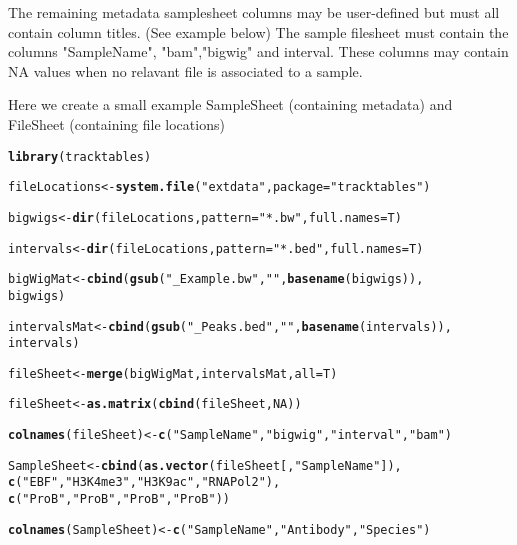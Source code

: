 \documentclass[12pt]{article}\usepackage[]{graphicx}\usepackage[usenames,dvipsnames]{color}
\makeatletter
\newcommand{\hlnum}[1]{\textcolor[rgb]{0.686,0.059,0.569}{#1}}%
\newcommand{\hlstr}[1]{\textcolor[rgb]{0.192,0.494,0.8}{#1}}%
\newcommand{\hlstd}[1]{\textcolor[rgb]{0.345,0.345,0.345}{#1}}%
\newcommand{\hlkwb}[1]{\textcolor[rgb]{0.69,0.353,0.396}{#1}}%
\newcommand{\hlkwc}[1]{\textcolor[rgb]{0.333,0.667,0.333}{#1}}%
\newcommand{\hlkwd}[1]{\textcolor[rgb]{0.737,0.353,0.396}{\textbf{#1}}}%
\newenvironment{kframe}{%
 \def\at@end@of@kframe{}%
 \ifinner\ifhmode%
  \def\at@end@of@kframe{\end{minipage}}%
  \begin{minipage}{\columnwidth}%
 \fi\fi%
 \def\FrameCommand##1{\hskip\@totalleftmargin \hskip-\fboxsep
 \colorbox{shadecolor}{##1}\hskip-\fboxsep
     \hskip-\linewidth \hskip-\@totalleftmargin \hskip\columnwidth}%
 \MakeFramed {\advance\hsize-\width
   \@totalleftmargin\z@ \linewidth\hsize
   \@setminipage}}%
 {\par\unskip\endMakeFramed%
 \at@end@of@kframe}
\newenvironment{knitrout}{}{} %
\makeatother
\begin{document}
The remaining metadata samplesheet columns may be user-defined but must all contain column titles. (See example below)
The sample filesheet must contain the columns "SampleName", "bam","bigwig" and interval. These columns may contain NA values when no relavant file is associated to a sample.

Here we create a small example SampleSheet (containing metadata) and FileSheet (containing file locations)


\begin{knitrout}
\color{fgcolor}\begin{kframe}
\begin{alltt}
\hlkwd{library}\hlstd{(tracktables)}

\hlstd{fileLocations} \hlkwb{<-} \hlkwd{system.file}\hlstd{(}\hlstr{"extdata"}\hlstd{,}\hlkwc{package}\hlstd{=}\hlstr{"tracktables"}\hlstd{)}

\hlstd{bigwigs} \hlkwb{<-} \hlkwd{dir}\hlstd{(fileLocations,}\hlkwc{pattern}\hlstd{=}\hlstr{"*.bw"}\hlstd{,}\hlkwc{full.names}\hlstd{=T)}

\hlstd{intervals} \hlkwb{<-} \hlkwd{dir}\hlstd{(fileLocations,}\hlkwc{pattern}\hlstd{=}\hlstr{"*.bed"}\hlstd{,}\hlkwc{full.names}\hlstd{=T)}

\hlstd{bigWigMat} \hlkwb{<-} \hlkwd{cbind}\hlstd{(}\hlkwd{gsub}\hlstd{(}\hlstr{"_Example.bw"}\hlstd{,}\hlstr{""}\hlstd{,}\hlkwd{basename}\hlstd{(bigwigs)),}
                   \hlstd{bigwigs)}

\hlstd{intervalsMat} \hlkwb{<-} \hlkwd{cbind}\hlstd{(}\hlkwd{gsub}\hlstd{(}\hlstr{"_Peaks.bed"}\hlstd{,}\hlstr{""}\hlstd{,}\hlkwd{basename}\hlstd{(intervals)),}
                      \hlstd{intervals)}

\hlstd{fileSheet} \hlkwb{<-} \hlkwd{merge}\hlstd{(bigWigMat,intervalsMat,}\hlkwc{all}\hlstd{=T)}

\hlstd{fileSheet} \hlkwb{<-} \hlkwd{as.matrix}\hlstd{(}\hlkwd{cbind}\hlstd{(fileSheet,}\hlnum{NA}\hlstd{))}

\hlkwd{colnames}\hlstd{(fileSheet)} \hlkwb{<-} \hlkwd{c}\hlstd{(}\hlstr{"SampleName"}\hlstd{,}\hlstr{"bigwig"}\hlstd{,}\hlstr{"interval"}\hlstd{,}\hlstr{"bam"}\hlstd{)}

\hlstd{SampleSheet} \hlkwb{<-} \hlkwd{cbind}\hlstd{(}\hlkwd{as.vector}\hlstd{(fileSheet[,}\hlstr{"SampleName"}\hlstd{]),}
                     \hlkwd{c}\hlstd{(}\hlstr{"EBF"}\hlstd{,}\hlstr{"H3K4me3"}\hlstd{,}\hlstr{"H3K9ac"}\hlstd{,}\hlstr{"RNAPol2"}\hlstd{),}
                     \hlkwd{c}\hlstd{(}\hlstr{"ProB"}\hlstd{,}\hlstr{"ProB"}\hlstd{,}\hlstr{"ProB"}\hlstd{,}\hlstr{"ProB"}\hlstd{))}

\hlkwd{colnames}\hlstd{(SampleSheet)} \hlkwb{<-} \hlkwd{c}\hlstd{(}\hlstr{"SampleName"}\hlstd{,}\hlstr{"Antibody"}\hlstd{,}\hlstr{"Species"}\hlstd{)}
\end{alltt}
\end{kframe}
\end{knitrout}
\end{document}
